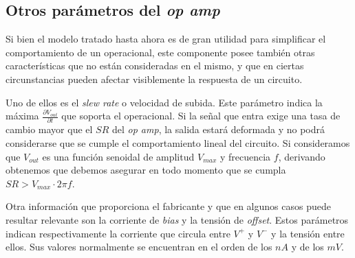 \documentclass[main.tex]{subfiles}
\begin{document}
\subsection{Otros par\'ametros del \textit{op amp}}
Si bien el modelo tratado hasta ahora es de gran utilidad para simplificar el comportamiento de un operacional, este componente posee tambi\'en otras caracter\'isticas que no est\'an consideradas en el mismo, y que en ciertas circunstancias pueden afectar visiblemente la respuesta de un circuito.\par

Uno de ellos es el \textit{slew rate} o velocidad de subida. Este par\'ametro indica la m\'axima $\frac{\partial V_{out}}{\partial t}$ que soporta el operacional. Si la se\~nal que entra exige una tasa de cambio mayor que el $SR$ del \textit{op amp}, la salida estar\'a deformada y no podr\'a considerarse que se cumple el comportamiento lineal del circuito. Si consideramos que $V_{out}$ es una funci\'on senoidal de amplitud $V_{max}$ y frecuencia $f$, derivando obtenemos que debemos asegurar en todo momento que se cumpla $SR > V_{max} \cdot 2\pi f$. \par

Otra informaci\'on que proporciona el fabricante y que en algunos casos puede resultar relevante son la corriente de \textit{bias} y la tensi\'on de \textit{offset}. Estos par\'ametros indican respectivamente la corriente que circula entre $V^+$ y $V^-$ y la tensi\'on entre ellos. Sus valores normalmente se encuentran en el orden de los $nA$ y de los $mV$. \par

 
\end{document}
